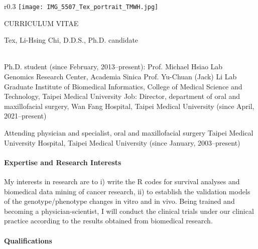 
\begin{vita}

\begin{wrapfigure}{r}{0.3\textwidth}
    \centering
    \texttt{[image: IMG\_5507\_Tex\_portrait\_TMWH.jpg]}
\end{wrapfigure}

CURRICULUM VITAE

Tex, Li-Hsing Chi, D.D.S., Ph.D. candidate\\
\\

\begin{outline}

\0 Ph.D. student (since February, 2013--present):
\1 Prof. Michael Hsiao Lab\\
Genomics Research Center, Academia Sinica
\1 Prof. Yu-Chuan (Jack) Li Lab\\
Graduate Institute of Biomedical Informatics, College of Medical Science and Technology, Taipei Medical University
\0 Job: %
\1 Director, department of oral and maxillofacial surgery,
Wan Fang Hospital, Taipei Medical University (since April, 2021--present)

\1 Attending physician and specialist, oral and maxillofacial surgery
Taipei Medical University Hospital, Taipei Medical University (since January, 2003--present)

\end{outline}



\paragraph*{Expertise and Research Interests}

My interests in research are to i) write the R codes for survival analyses and biomedical data mining of cancer research, ii) to establish the validation models of the genotype/phenotype changes in vitro and in vivo. Being trained and becoming a physician-scientist, I will conduct the clinical trials under our clinical practice according to the results obtained from biomedical research. 


\paragraph*{Qualifications}


\end{vita}

